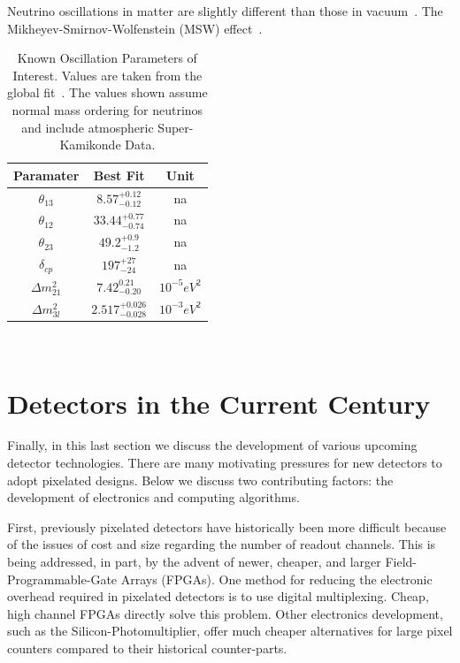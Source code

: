 Neutrino oscillations in matter are slightly different than those in vacuum~\citep{PhysRevD.17.2369}.
The Mikheyev-Smirnov-Wolfenstein (MSW) effect~\citep{Smirnov2004TheME}.

\begin{table}
\begin{center}
\begin{tabular}{||c c c||}
 \hline
 Paramater & Best Fit & Unit \\ [0.5ex]
 \hline\hline
  $\theta_{13}$ & $8.57^{+0.12}_{-0.12}$ & na \\
 \hline
  $\theta_{12}$ & $33.44^{+0.77}_{-0.74}$ & na \\
 \hline
  $\theta_{23}$ & $49.2^{+0.9}_{-1.2}$ & na \\
 \hline
  $\delta_{cp}$ & $197^{+27}_{-24}$ & na \\
 \hline
  $\Delta m_{21}^{2}$ & $7.42^{0.21}_{-0.20}$ & $10^{-5}eV^{2}$ \\
 \hline
  $\Delta m_{3l}^{2}$ & $2.517^{+0.026}_{-0.028}$ & $10^{-3}eV^{2}$ \\
 \hline
\end{tabular}
\caption{Known Oscillation Parameters of Interest. Values are taken from the global fit~\citep{2020JHEP...09..178E}. The values shown assume normal mass ordering for neutrinos and include atmospheric Super-Kamikonde Data.}
\end{center}
\end{table}
~\label{table:pmns_params}

\section{Detectors in the Current Century}

Finally, in this last section we discuss the development of various upcoming detector technologies.
There are many motivating pressures for new detectors to adopt pixelated designs. 
Below we discuss two contributing factors: the development of electronics and computing algorithms.

First, previously pixelated detectors have historically been more difficult because of the issues of cost and size regarding the number of readout channels.
This is being addressed, in part, by the advent of newer, cheaper, and larger Field-Programmable-Gate Arrays (FPGAs).
One method for reducing the electronic overhead required in pixelated detectors is to use digital multiplexing.
Cheap, high channel FPGAs directly solve this problem. 
Other electronics development, such as the Silicon-Photomultiplier, offer much cheaper alternatives for large pixel counters compared to their historical counter-parts. 

